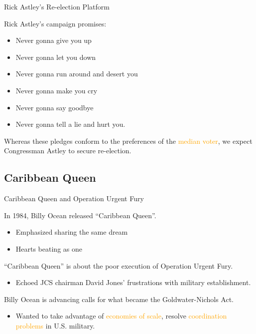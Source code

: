 \documentclass[10pt,ignorenonframetext,]{beamer}
\providecommand{\tightlist}{%
  \setlength{\itemsep}{0pt}\setlength{\parskip}{0pt}}
\begin{document}
\begin{frame}{Rick Astley's Re-election Platform}
\protect\hypertarget{rick-astleys-re-election-platform}{}

Rick Astley's campaign promises:

\begin{itemize}
\tightlist
\item
  Never gonna give you up
\item
  Never gonna let you down
\item
  Never gonna run around and desert you
\item
  Never gonna make you cry
\item
  Never gonna say goodbye
\item
  Never gonna tell a lie and hurt you.
\end{itemize}

\bigskip Whereas these pledges conform to the preferences of the
\textcolor{orange}{median voter}, we expect Congressman Astley to secure
re-election.

\end{frame}

\hypertarget{caribbean-queen}{%
\subsection{Caribbean Queen}\label{caribbean-queen}}

\begin{frame}{Caribbean Queen and Operation Urgent Fury}
\protect\hypertarget{caribbean-queen-and-operation-urgent-fury}{}

In 1984, Billy Ocean released ``Caribbean Queen''.

\begin{itemize}
\tightlist
\item
  Emphasized sharing the same dream
\item
  Hearts beating as one
\end{itemize}

\bigskip ``Caribbean Queen'' is about the poor execution of Operation
Urgent Fury.

\begin{itemize}
\tightlist
\item
  Echoed JCS chairman David Jones' frustrations with military
  establishment.
\end{itemize}

\bigskip Billy Ocean is advancing calls for what became the
Goldwater-Nichols Act.

\begin{itemize}
\tightlist
\item
  Wanted to take advantage of \textcolor{orange}{economies of scale},
  resolve \textcolor{orange}{coordination problems} in U.S. military.
\end{itemize}

\end{frame}
\end{document}

